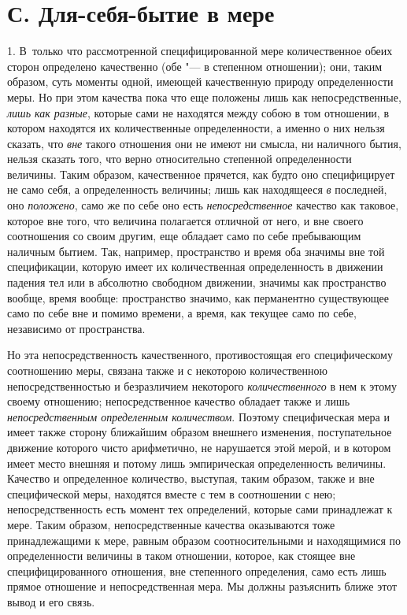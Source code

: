 \section[С. Для-себя-бытие в мере]{С. Для-себя-бытие в мере}
1. В~только что рассмотренной специфицированной
мере количественное обеих сторон определено качественно (обе "--- в степенном
отношении); они, таким образом, суть моменты одной, имеющей качественную
природу определенности меры. Но при этом качества пока что еще положены
лишь как непосредственные, {\em лишь как разные},
которые сами не находятся между собою в том отношении, в котором находятся
их количественные определенности, а именно о них нельзя сказать, что
{\em вне} такого отношения они не имеют ни смысла, ни
наличного бытия, нельзя сказать того, что верно относительно степенной
определенности величины. Таким образом, качественное прячется, как будто
оно специфицирует не само себя, а определенность величины; лишь как
находящееся {\em в} последней, оно
{\em положено}, само же по себе оно есть
{\em непосредственное} качество как таковое, которое
вне того, что величина полагается отличной от него, и вне своего
соотношения со своим другим, еще обладает само по себе пребывающим наличным
бытием. Так, например, пространство и время оба значимы вне той
спецификации, которую имеет их количественная определенность в движении
падения тел или в абсолютно свободном движении, значимы как пространство
вообще, время вообще: пространство значимо, как перманентно существующее
само по себе вне и помимо времени, а время, как текущее само по себе,
независимо от пространства.

Но эта непосредственность качественного, противостоящая его специфическому
соотношению меры, связана также и с некоторою количественною
непосредственностью и безразличием некоторого
{\em количественного} в нем к этому своему отношению;
непосредственное качество обладает также и лишь
{\em непосредственным определенным количеством}.
Поэтому специфическая мера и имеет также сторону ближайшим образом внешнего
изменения, поступательное движение которого чисто арифметично, не
нарушается этой мерой, и в котором имеет место внешняя и потому лишь
эмпирическая определенность величины. Качество и определенное количество,
выступая, таким образом, также и вне специфической меры, находятся вместе с
тем в соотношении с нею; непосредственность есть момент тех определений,
которые сами принадлежат к мере. Таким образом, непосредственные качества
оказываются тоже принадлежащими к мере, равным образом соотносительными и
находящимися по определенности величины в таком отношении, которое, как
стоящее вне специфицированного отношения, вне степенного определения, само
есть лишь прямое отношение и непосредственная мера. Мы должны разъяснить
ближе этот вывод и его связь.


